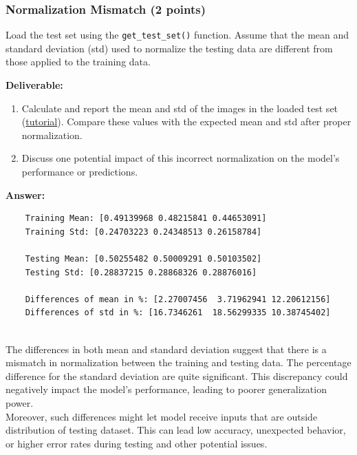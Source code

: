 \documentclass[11pt, oneside]{article}   	%
\begin{document}
\subsubsection*{Normalization Mismatch (2 points)}

Load the test set using the \texttt{get\_test\_set()} function. Assume that the mean and standard deviation (std) used to normalize the testing data are different from those applied to the training data.

\noindent\textbf{Deliverable:}

\begin{enumerate} \item Calculate and report the mean and std of the images in the loaded test set (\href{https://stackoverflow.com/questions/73350133/how-to-calculate-mean-and-standard-deviation-of-a-set-of-images}{tutorial}). Compare these values with the expected mean and std after proper normalization.

\item Discuss one potential impact of this incorrect normalization on the model's performance or predictions. 

\end{enumerate}
\textbf{Answer:} \\
\begin{verbatim}
    Training Mean: [0.49139968 0.48215841 0.44653091]
    Training Std: [0.24703223 0.24348513 0.26158784]

    Testing Mean: [0.50255482 0.50009291 0.50103502]
    Testing Std: [0.28837215 0.28868326 0.28876016]

    Differences of mean in %: [2.27007456  3.71962941 12.20612156]
    Differences of std in %: [16.7346261  18.56299335 10.38745402]
\end{verbatim}
\\
The differences in both mean and standard deviation suggest that there is a mismatch in normalization between the training and testing data. The percentage difference for the standard deviation are quite significant.
This discrepancy could negatively impact the model's performance, leading to poorer generalization power.
\\
Moreover, such differences might let model receive inputs that are outside distribution of testing dataset. This can lead low accuracy, unexpected behavior, or higher error rates during testing and other potential issues.
\end{document}
